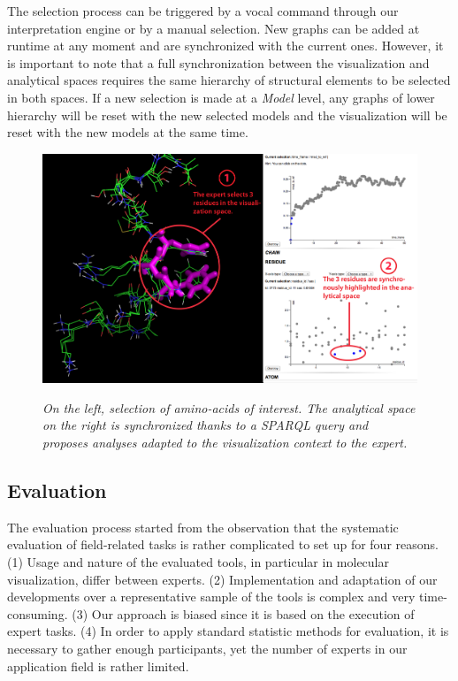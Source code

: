 \documentclass{vgtc}                          %
\begin{document}
The selection process can be triggered by a vocal command through our interpretation engine or by a manual selection. 
New graphs can be added at runtime at any moment and are synchronized with the current ones. However, it is important to note that a full synchronization between the visualization and analytical spaces requires the same hierarchy of structural elements to be selected in both spaces. If a new selection is made at a \textit{Model} level, any graphs of lower hierarchy will be reset with the new selected models and the visualization will be reset with the new models at the same time.

\begin{figure}[!htb]
  \centering
  {\includegraphics[width=\linewidth,frame]{./figures/scenario_step_2_cropped}}
    \caption[]{{\it On the left, selection of amino-acids of interest. The analytical space on the right is synchronized thanks to a SPARQL query and proposes analyses adapted to the visualization context to the expert.}}
  \label{Fig:2nd_step}
\end{figure}

\subsection{Evaluation}

The evaluation process started from the observation that the systematic evaluation of field-related tasks is rather complicated to set up for four reasons. (1) Usage and nature of the evaluated tools, in particular in molecular visualization, differ between experts. (2) Implementation and adaptation of our developments over a representative sample of the tools is complex and very time-consuming. (3) Our approach is biased since it is based on the execution of expert tasks. (4) In order to apply standard statistic methods for evaluation, it is necessary to gather enough participants, yet the number of experts in our application field is rather limited.
\end{document}
